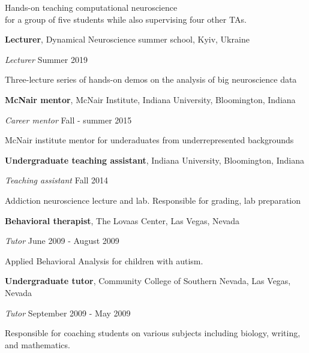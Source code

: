 \documentclass[10pt]{article}
\begin{document}
Hands-on teaching computational neuroscience \\for a group of five students while also supervising four other TAs.
\vspace{.15in}

{\textbf{Lecturer}}, Dynamical Neuroscience summer school, Kyiv, Ukraine \nopagebreak[4]

\vspace{.05in}
\textit{Lecturer}	\hfill {Summer 2019}

Three-lecture series of hands-on demos on the analysis of big neuroscience data

\vspace{.15in}

{\textbf{McNair mentor}}, McNair Institute, Indiana University, Bloomington, Indiana
\nopagebreak[4]
\vspace{.05in}

\textit{Career mentor} \hfill {Fall - summer 2015}

McNair institute mentor for underaduates from underrepresented backgrounds

\vspace{.15in}

{\textbf{Undergraduate teaching assistant}}, Indiana University, Bloomington, Indiana
\nopagebreak[4]
\vspace{.05in}

\textit{Teaching assistant} \hfill {Fall 2014}

Addiction neuroscience lecture and lab. Responsible for grading, lab preparation

\vspace{.15in}

{\textbf{Behavioral therapist}}, The Lovaas Center, Las Vegas, Nevada

\vspace{.05in}
\textit{Tutor} 	\hfill {June 2009 - August 2009}

Applied Behavioral Analysis for children with autism.

\vspace{.15in}

{\textbf{Undergraduate tutor}}, Community College of Southern Nevada, Las Vegas, Nevada

\vspace{.05in}
\textit{Tutor}	\hfill {September 2009 - May 2009}
	
Responsible for coaching students on various subjects including biology, writing, and mathematics. 
\end{document}
